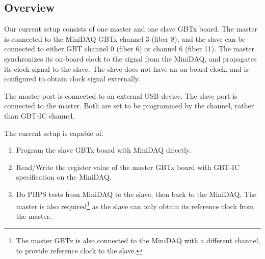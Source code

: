 \subsection{Overview}
Our current setup consists of one master and one slave GBTx board.
The master is connected to the MiniDAQ GBTx channel 3 (fiber 8),
and the slave can be connected to either GBT channel 0 (fiber 6) or channel 6
(fiber 11).
The master synchronizes its on-board clock to the signal from the MiniDAQ,
and propagates its clock signal to the slave.
The slave does not have an on-board clock,
and is configured to obtain clock signal externally.

The master \itwoc port is connected to an external USB device.
The slave \itwoc port is connected to the master.
Both are set to be programmed by the \itwoc channel,
rather than GBT-IC channel.

The current setup is capable of:
\begin{enumerate}
    \item Program the slave GBTx board with MiniDAQ directly.
    \item Read/Write the register value of the master GBTx board with GBT-IC
        specification on the MiniDAQ.
    \item Do PBPS tests from MiniDAQ to the slave, then back to the
        MiniDAQ.
        The master is also required\footnote{
            The master GBTx is also connected to the MiniDAQ with a different
        channel, to provide reference clock to the slave.}
        as the slave can only obtain its reference clock from the master.
\end{enumerate}
